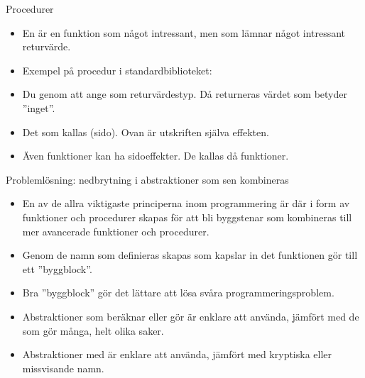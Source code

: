 \begin{Slide}{Procedurer}\SlideFontSmall
\begin{itemize}
\item En  är en funktion som  något intressant, men som  lämnar något intressant returvärde.
\item Exempel på procedur i standardbiblioteket: 
\item Du  genom att ange \texttt{} som returvärdestyp. Då returneras värdet \texttt{\Alert{()}} som betyder ''inget''.
\end{itemize}
\begin{itemize}
\item Det som  kallas (sido). Ovan är utskriften själva effekten.
\item Även funktioner kan ha sidoeffekter. De kallas då  funktioner.
\end{itemize}
\end{Slide}

\begin{Slide}{Problemlösning: nedbrytning i abstraktioner som sen kombineras}\SlideFontSmall
\begin{itemize}
\item En av de allra viktigaste principerna inom programmering är  där   i form av funktioner och procedurer skapas för att bli byggstenar som kombineras till mer avancerade funktioner och procedurer.

\item Genom de namn som definieras skapas  som kapslar in det funktionen gör till ett ''byggblock''.

\item Bra ''byggblock'' gör det lättare att lösa svåra programmeringsproblem.

\item Abstraktioner som beräknar eller gör  är enklare att använda, jämfört med de som gör många, helt olika saker.

\item Abstraktioner med  är enklare att använda, jämfört med kryptiska eller missvisande namn.
\end{itemize}

\end{Slide}

